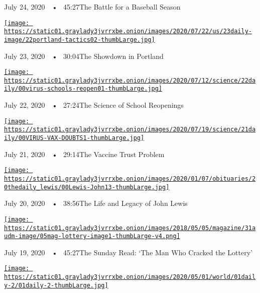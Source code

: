 July 24, 2020~~•~ 45:27The Battle for a Baseball Season

\href{https://www.nytimes3xbfgragh.onion/2020/07/23/podcasts/the-daily/portland-protests.html?action=click\&module=audio-series-bar\&region=header\&pgtype=Article}{\texttt{[image: https://static01.graylady3jvrrxbe.onion/images/2020/07/22/us/23daily-image/22portland-tactics02-thumbLarge.jpg]}}

July 23, 2020~~•~ 30:04The Showdown in Portland

\href{https://www.nytimes3xbfgragh.onion/2020/07/22/podcasts/the-daily/school-reopenings-coronavirus.html?action=click\&module=audio-series-bar\&region=header\&pgtype=Article}{\texttt{[image: https://static01.graylady3jvrrxbe.onion/images/2020/07/12/science/22daily/00virus-schools-reopen01-thumbLarge.jpg]}}

July 22, 2020~~•~ 27:24The Science of School Reopenings

\href{https://www.nytimes3xbfgragh.onion/2020/07/21/podcasts/the-daily/coronavirus-vaccine.html?action=click\&module=audio-series-bar\&region=header\&pgtype=Article}{\texttt{[image: https://static01.graylady3jvrrxbe.onion/images/2020/07/19/science/21daily/00VIRUS-VAX-DOUBTS1-thumbLarge.jpg]}}

July 21, 2020~~•~ 29:14The Vaccine Trust Problem

\href{https://www.nytimes3xbfgragh.onion/2020/07/20/podcasts/the-daily/john-lewis.html?action=click\&module=audio-series-bar\&region=header\&pgtype=Article}{\texttt{[image: https://static01.graylady3jvrrxbe.onion/images/2020/01/07/obituaries/20thedaily\_lewis/00Lewis-John13-thumbLarge.jpg]}}

July 20, 2020~~•~ 38:56The Life and Legacy of John Lewis

\href{https://www.nytimes3xbfgragh.onion/2020/07/19/podcasts/the-daily/lottery-winner-scam.html?action=click\&module=audio-series-bar\&region=header\&pgtype=Article}{\texttt{[image: https://static01.graylady3jvrrxbe.onion/images/2018/05/05/magazine/31audm-image/05mag-lottery-image1-thumbLarge-v4.png]}}

July 19, 2020~~•~ 45:27The Sunday Read: `The Man Who Cracked the
Lottery'

\href{https://www.nytimes3xbfgragh.onion/2020/07/17/podcasts/the-daily/grandparents-coronavirus.html?action=click\&module=audio-series-bar\&region=header\&pgtype=Article}{\texttt{[image: https://static01.graylady3jvrrxbe.onion/images/2020/05/01/world/01daily-2/01daily-2-thumbLarge.jpg]}}

